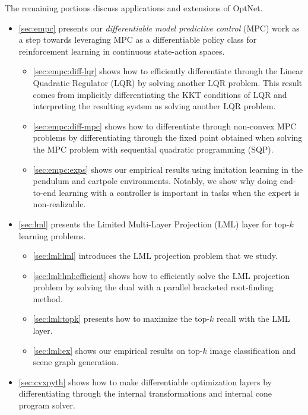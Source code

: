 \vspace{4mm}
The remaining portions discuss applications and
extensions of OptNet.
\begin{itemize}
\item \cref{sec:empc} presents our
  \emph{differentiable model predictive control} (MPC) work
  as a step towards leveraging MPC as a differentiable
  policy class for reinforcement learning in continuous
  state-action spaces.
  \begin{itemize}
  \item \cref{sec:empc:diff-lqr} shows how to efficiently
    differentiate through the Linear Quadratic Regulator (LQR)
    by solving another LQR problem.
    This result comes from implicitly differentiating the KKT
    conditions of LQR and interpreting the resulting system
    as solving another LQR problem.
  \item \cref{sec:empc:diff-mpc} shows how to differentiate
    through non-convex MPC problems by differentiating through the
    fixed point obtained when solving the MPC problem with
    sequential quadratic programming (SQP).
  \item \cref{sec:empc:exps} shows our empirical results
    using imitation learning in the pendulum and cartpole
    environments.
    Notably, we show why doing end-to-end learning with
    a controller is important in tasks when the expert
    is non-realizable.
  \end{itemize}
  \newpage
\item \cref{sec:lml} presents the Limited Multi-Layer Projection
  (LML) layer for top-$k$ learning problems.
  \begin{itemize}
  \item \cref{sec:lml:lml} introduces the LML projection problem
    that we study.
  \item \cref{sec:lml:lml:efficient} shows how to efficiently
    solve the LML projection problem by solving the dual
    with a parallel bracketed root-finding method.
  \item \cref{sec:lml:topk} presents how to maximize
    the top-$k$ recall with the LML layer.
  \item \cref{sec:lml:ex} shows our empirical results on
    top-$k$ image classification and scene graph generation.
  \end{itemize}
\item \cref{sec:cvxpyth} shows how to make differentiable
  \cvxpy optimization layers by differentiating through
  the internal transformations and internal cone program solver.

\end{itemize}
